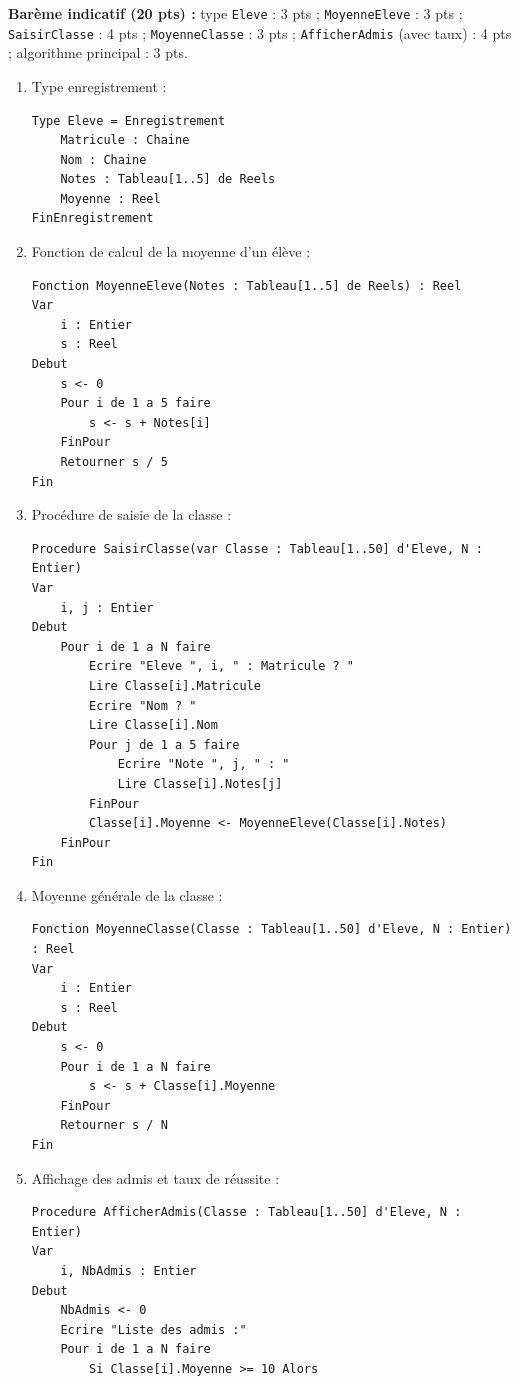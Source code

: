 \documentclass[11pt]{article}
\begin{document}
\begin{corrige}
\textbf{Barème indicatif (20 pts) :} type \texttt{Eleve} : 3 pts ; \texttt{MoyenneEleve} : 3 pts ; \texttt{SaisirClasse} : 4 pts ; \texttt{MoyenneClasse} : 3 pts ; \texttt{AfficherAdmis} (avec taux) : 4 pts ; algorithme principal : 3 pts.

\begin{enumerate}
    \item Type enregistrement :
\begin{lstlisting}
Type Eleve = Enregistrement
    Matricule : Chaine
    Nom : Chaine
    Notes : Tableau[1..5] de Reels
    Moyenne : Reel
FinEnregistrement
\end{lstlisting}
    \item Fonction de calcul de la moyenne d'un élève :
\begin{lstlisting}
Fonction MoyenneEleve(Notes : Tableau[1..5] de Reels) : Reel
Var
    i : Entier
    s : Reel
Debut
    s <- 0
    Pour i de 1 a 5 faire
        s <- s + Notes[i]
    FinPour
    Retourner s / 5
Fin
\end{lstlisting}
    \item Procédure de saisie de la classe :
\begin{lstlisting}
Procedure SaisirClasse(var Classe : Tableau[1..50] d'Eleve, N : Entier)
Var
    i, j : Entier
Debut
    Pour i de 1 a N faire
        Ecrire "Eleve ", i, " : Matricule ? "
        Lire Classe[i].Matricule
        Ecrire "Nom ? "
        Lire Classe[i].Nom
        Pour j de 1 a 5 faire
            Ecrire "Note ", j, " : "
            Lire Classe[i].Notes[j]
        FinPour
        Classe[i].Moyenne <- MoyenneEleve(Classe[i].Notes)
    FinPour
Fin
\end{lstlisting}
    \item Moyenne générale de la classe :
\begin{lstlisting}
Fonction MoyenneClasse(Classe : Tableau[1..50] d'Eleve, N : Entier) : Reel
Var
    i : Entier
    s : Reel
Debut
    s <- 0
    Pour i de 1 a N faire
        s <- s + Classe[i].Moyenne
    FinPour
    Retourner s / N
Fin
\end{lstlisting}
    \item Affichage des admis et taux de réussite :
\begin{lstlisting}
Procedure AfficherAdmis(Classe : Tableau[1..50] d'Eleve, N : Entier)
Var
    i, NbAdmis : Entier
Debut
    NbAdmis <- 0
    Ecrire "Liste des admis :"
    Pour i de 1 a N faire
        Si Classe[i].Moyenne >= 10 Alors

\end{lstlisting}
\end{enumerate}
\end{corrige}
\end{document}

